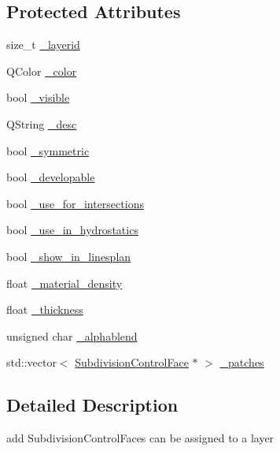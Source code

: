 \subsection*{Protected Attributes}
\begin{DoxyCompactItemize}
\item 
size\+\_\+t \hyperlink{classShipCAD_1_1SubdivisionLayer_a73e4956d179d6ebd6c062e7e76bca196}{\+\_\+layerid}
\item 
Q\+Color \hyperlink{classShipCAD_1_1SubdivisionLayer_a6da22248952737662360fa3b2730a35f}{\+\_\+color}
\item 
bool \hyperlink{classShipCAD_1_1SubdivisionLayer_a2d606476aba40bbbfc115c449f46ac26}{\+\_\+visible}
\item 
Q\+String \hyperlink{classShipCAD_1_1SubdivisionLayer_a33bbfedf8f0d130d91c74a65a575eb2a}{\+\_\+desc}
\item 
bool \hyperlink{classShipCAD_1_1SubdivisionLayer_aaeddcdf1d08d84c76c5453f4a71fbe7a}{\+\_\+symmetric}
\item 
bool \hyperlink{classShipCAD_1_1SubdivisionLayer_a81dad738f58f9b4632c1575d0b59ddb0}{\+\_\+developable}
\item 
bool \hyperlink{classShipCAD_1_1SubdivisionLayer_a8213aa3e02493472fb11949f595446f2}{\+\_\+use\+\_\+for\+\_\+intersections}
\item 
bool \hyperlink{classShipCAD_1_1SubdivisionLayer_ad36d65882f0c46ff1b3ced7d48c173f4}{\+\_\+use\+\_\+in\+\_\+hydrostatics}
\item 
bool \hyperlink{classShipCAD_1_1SubdivisionLayer_a373fd987b5f973a995517e7f97fda5ac}{\+\_\+show\+\_\+in\+\_\+linesplan}
\item 
float \hyperlink{classShipCAD_1_1SubdivisionLayer_adfdd4e996a5be7147a2eeb682dd93ff8}{\+\_\+material\+\_\+density}
\item 
float \hyperlink{classShipCAD_1_1SubdivisionLayer_a00a308fdf03a0c1d9a6fa65f965e7942}{\+\_\+thickness}
\item 
unsigned char \hyperlink{classShipCAD_1_1SubdivisionLayer_a1681170da038b0708d1b4dcd2ec89b81}{\+\_\+alphablend}
\item 
std\+::vector$<$ \hyperlink{classShipCAD_1_1SubdivisionControlFace}{Subdivision\+Control\+Face} $\ast$ $>$ \hyperlink{classShipCAD_1_1SubdivisionLayer_a98b25b86a7104e4f987d34506438113f}{\+\_\+patches}
\end{DoxyCompactItemize}


\subsection{Detailed Description}
add Subdivision\+Control\+Faces can be assigned to a layer 

